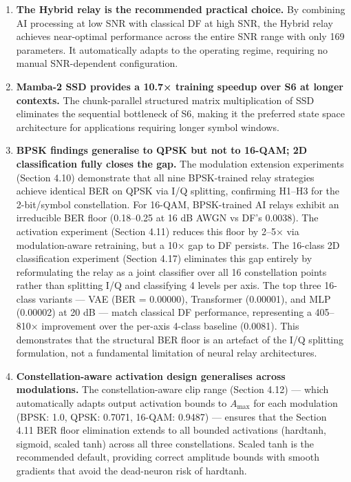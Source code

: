 \begin{enumerate}
  \textbf{MMSE-SIC provides the best MIMO equalization.} The non-linear SIC technique consistently outperforms both ZF and MMSE for all relay types, confirming the benefit of successive interference cancellation in the spatial multiplexing setting. The equalization gains are additive to the relay processing gains.
\item
  \textbf{The Hybrid relay is the recommended practical choice.} By combining AI processing at low SNR with classical DF at high SNR, the Hybrid relay achieves near-optimal performance across the entire SNR range with only 169 parameters. It automatically adapts to the operating regime, requiring no manual SNR-dependent configuration.
\item
  \textbf{Mamba-2 SSD provides a 10.7× training speedup over S6 at longer contexts.} The chunk-parallel structured matrix multiplication of SSD eliminates the sequential bottleneck of S6, making it the preferred state space architecture for applications requiring longer symbol windows.
\item
  \textbf{BPSK findings generalise to QPSK but not to 16-QAM; 2D classification fully closes the gap.} The modulation extension experiments (Section 4.10) demonstrate that all nine BPSK-trained relay strategies achieve identical BER on QPSK via I/Q splitting, confirming H1--H3 for the 2-bit/symbol constellation. For 16-QAM, BPSK-trained AI relays exhibit an irreducible BER floor (0.18--0.25 at 16 dB AWGN vs DF's 0.0038). The activation experiment (Section 4.11) reduces this floor by 2--5× via modulation-aware retraining, but a 10× gap to DF persists. The 16-class 2D classification experiment (Section 4.17) eliminates this gap entirely by reformulating the relay as a joint classifier over all 16 constellation points rather than splitting I/Q and classifying 4 levels per axis. The top three 16-class variants --- VAE (BER = 0.00000), Transformer (0.00001), and MLP (0.00002) at 20 dB --- match classical DF performance, representing a 405--810× improvement over the per-axis 4-class baseline (0.0081). This demonstrates that the structural BER floor is an artefact of the I/Q splitting formulation, not a fundamental limitation of neural relay architectures.
\item
  \textbf{Constellation-aware activation design generalises across modulations.} The constellation-aware clip range (Section 4.12) --- which automatically adapts output activation bounds to \(A_{\max}\) for each modulation (BPSK: 1.0, QPSK: 0.7071, 16-QAM: 0.9487) --- ensures that the Section 4.11 BER floor elimination extends to all bounded activations (hardtanh, sigmoid, scaled tanh) across all three constellations. Scaled tanh is the recommended default, providing correct amplitude bounds with smooth gradients that avoid the dead-neuron risk of hardtanh.

\end{enumerate}
